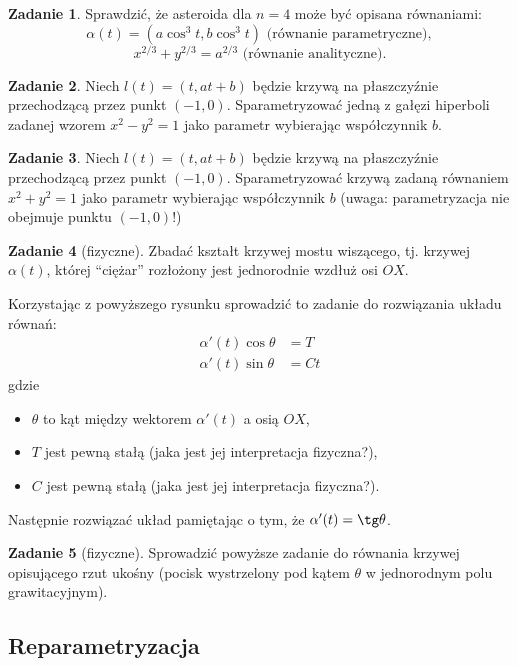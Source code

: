 \documentclass[a4paper,11pt]{article}
\theoremstyle{definition}\newtheorem{exercise}{Zadanie}
\theoremstyle{definition}\newtheorem{remark}{Uwaga}
\begin{document}
\begin{exercise}
 Sprawdzić, że asteroida dla $n=4$ może być opisana równaniami:
\[\alpha(t)=(a \cos^3{t},b\cos^3{t})\text{ (r\'ownanie parametryczne)},\] 
\[x^{2/3}+y^{2/3}=a^{2/3}\text{ (r\'ownanie analityczne)}.\]
\end{exercise}

\begin{exercise}
Niech $l(t)=(t,at+b)$ będzie krzywą na płaszczyźnie przechodzącą przez punkt 
$(-1,0)$. Sparametryzować jedną z gałęzi hiperboli zadanej wzorem $x^2-y^2=1$ 
jako parametr wybierając współczynnik $b$.
\end{exercise}

\begin{exercise}
Niech $l(t)=(t,at+b)$ będzie krzywą na płaszczyźnie przechodzącą przez punkt 
$(-1,0)$. Sparametryzować krzywą zadaną równaniem $x^2+y^2=1$ jako parametr 
wybierając współczynnik $b$ (uwaga: parametryzacja nie obejmuje punktu 
$(-1,0)$!)
\end{exercise}



\begin{exercise}[fizyczne]
Zbadać kształt krzywej mostu wiszącego, tj. krzywej $\alpha(t)$, kt\'orej 
``ciężar'' rozłożony jest jednorodnie wzdłuż osi $OX$. 

Korzystając z powyższego rysunku sprowadzić to zadanie do rozwiązania układu 
równań:
\begin{align*}
\alpha'(t)\cos\theta&=T\\
\alpha'(t)\sin\theta&=Ct
\end{align*}
gdzie 
\begin{itemize}
 \item $\theta$ to kąt między wektorem $\alpha'(t)$ a osią $OX$, 
 \item $T$ jest pewną stałą (jaka jest jej interpretacja fizyczna?),
 \item $C$ jest pewną stałą (jaka jest jej interpretacja fizyczna?).
\end{itemize}
Następnie rozwiązać układ pamiętając o tym, że $\alpha'(t)=\tg\theta$.
\end{exercise}

\begin{exercise}[fizyczne]
Sprowadzić powyższe zadanie do r\'ownania krzywej opisującego rzut ukośny 
(pocisk wystrzelony pod kątem $\theta$ w jednorodnym polu grawitacyjnym).
\end{exercise}

\subsection{Reparametryzacja}
\end{document}

